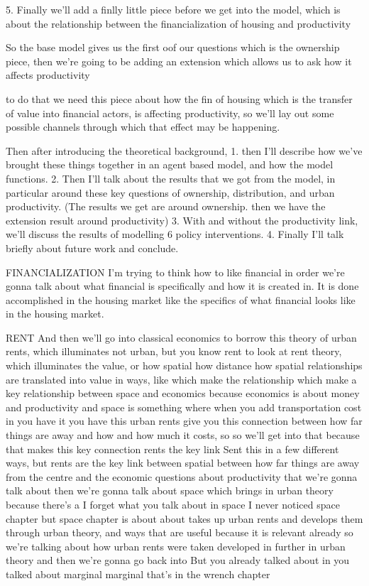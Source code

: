 5. Finally  we'll add a finlly little piece before we get  into the model,  which is about the relationship between the financialization of housing and productivity

So the base model gives us the first oof our questions which is the ownership piece, then we're going to be adding an extension which allows us to ask how it affects productivity

to do that we need this piece about how the fin of housing which is the transfer of value into financial actors, is affecting productivity, so we'll lay out some possible channels through which that effect may be happening.

Then  after introducing the theoretical background, 
1. then I'll describe how we've brought these things together in an agent based model, and how the model functions. 
2. Then I'll talk about the results that we got from the model, in particular around these key questions of ownership, distribution, and urban productivity.  (The results we get  are around ownership. then we have the extension result around productivity) 
3. With and without the productivity link, we'll discuss the results of modelling 6 policy interventions. 
4. Finally I'll talk briefly about future work and conclude. 





FINANCIALIZATION
I’m trying to think how to like financial in order we’re gonna talk about what financial is specifically and how it is created in. It is done accomplished in the housing market like the specifics of what financial looks like in the housing market.

RENT
And then we’ll go into classical economics to borrow this theory of urban rents, which illuminates not urban, but you know rent to look at rent theory, which illuminates the value, or how spatial how distance how spatial relationships are translated into value in ways, like which make the relationship which make a key relationship between space and economics because economics is about money and productivity and space is something where when you add transportation cost in you have it you have this urban rents give you this connection between how far things are away and how and how much it costs, so so we’ll get into that because that makes this key connection rents the key link Sent this in a few different ways, but rents are the key link between spatial between how far things are away from the centre and the economic questions about productivity that we’re gonna talk about then we’re gonna talk about space which brings in urban theory because there’s a I forget what you talk about in space I never noticed space chapter but space chapter is about about takes up urban rents and develops them through urban theory, and ways that are useful because it is relevant already so we’re talking about how urban rents were taken developed in further in urban theory and then we’re gonna go back into But you already talked about in you talked about marginal marginal that’s in the wrench chapter

